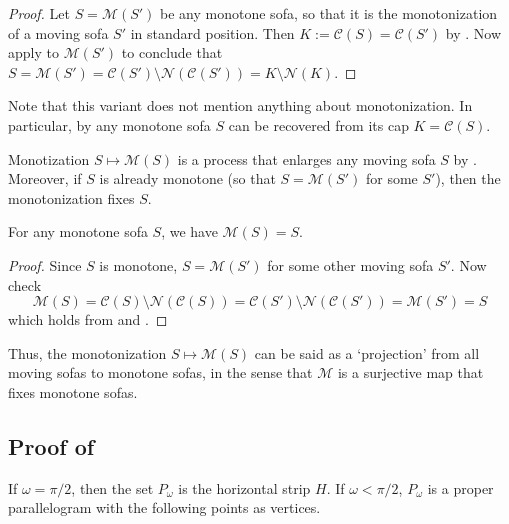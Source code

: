 \begin{proof}
Let \(S = \mathcal{M}(S')\) be any monotone sofa, so that it is the monotonization of a moving sofa \(S'\) in standard position. Then \(K := \mathcal{C}(S) = \mathcal{C}(S')\) by . Now apply  to \(\mathcal{M}(S')\) to conclude that \(S = \mathcal{M}(S') = \mathcal{C}(S') \setminus \mathcal{N}(\mathcal{C}(S')) = K \setminus \mathcal{N}(K)\).
\end{proof}

Note that this variant does not mention anything about monotonization. In particular, by  any monotone sofa \(S\) can be recovered from its cap \(K = \mathcal{C}(S)\).

Monotization \(S \mapsto \mathcal{M}(S)\) is a process that enlarges any moving sofa \(S\) by . Moreover, if \(S\) is already monotone (so that \(S = \mathcal{M}(S')\) for some \(S'\)), then the monotonization fixes \(S\).

\begin{theorem}

For any monotone sofa \(S\), we have \(\mathcal{M}(S) = S\).

\label{thm:monotonization-fixpoint}
\end{theorem}

\begin{proof}
Since \(S\) is monotone, \(S = \mathcal{M}(S')\) for some other moving sofa \(S'\). Now check
\[
\mathcal{M}(S) = \mathcal{C}(S) \setminus \mathcal{N}(\mathcal{C}(S)) = \mathcal{C}(S') \setminus \mathcal{N}(\mathcal{C}(S')) = \mathcal{M}(S') = S
\]
which holds from  and .
\end{proof}

Thus, the monotonization \(S \mapsto \mathcal{M}(S)\) can be said as a ‘projection’ from all moving sofas to monotone sofas, in the sense that \(\mathcal{M}\) is a surjective map that fixes monotone sofas.

\subsection{\texorpdfstring{Proof of }{Proof of }}

If \(\omega = \pi / 2\), then the set \(P_\omega\) is the horizontal strip \(H\). If \(\omega < \pi/2\), \(P_\omega\) is a proper parallelogram with the following points as vertices.

